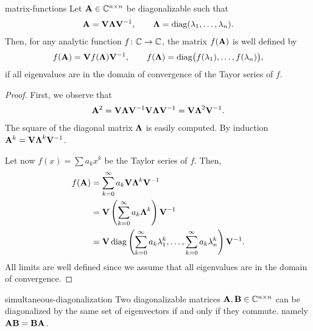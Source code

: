 \begin{Theorem}{matrix-functions}
  Let $\mathbf A\in \mathbb C^{n\times n}$ be diagonalizable such that
  \begin{gather}
    \mathbf A = \mathbf V \boldsymbol\Lambda \mathbf V^{-1},
    \qquad \boldsymbol\Lambda = \operatorname{diag}(\lambda_1,\dots,\lambda_n).
  \end{gather}
  Then, for any analytic function $f\colon \mathbb C \to \mathbb C$, the matrix
  $f(\mathbf A)$ is well defined by
  \begin{gather}
    f(\mathbf A) = \mathbf V f(\boldsymbol\Lambda) \mathbf V^{-1},
    \qquad f(\boldsymbol\Lambda) = \operatorname{diag}\bigl(f(\lambda_1),\dots,f(\lambda_n)\bigr),
  \end{gather}
  if all eigenvalues are in the domain of convergence of the Tayor
  series of $f$.
\end{Theorem}

\begin{proof}
  First, we observe that
  \begin{gather}
    \mathbf A^2 = \mathbf V \boldsymbol\Lambda \mathbf V^{-1} \mathbf V \boldsymbol\Lambda \mathbf V^{-1}
    = \mathbf V \boldsymbol\Lambda^2 \mathbf V^{-1}.
  \end{gather}
  The square of the diagonal matrix $\boldsymbol\Lambda$ is easily computed.
  By induction $\mathbf A^k =  \mathbf V \boldsymbol\Lambda^k \mathbf V^{-1}$.

  Let now $f(x) = \sum a_k x^k$ be the Taylor series of $f$. Then,
  \begin{gather}
    \begin{split}
      f(\mathbf A)
      &= \sum_{k=0}^\infty a_k  \mathbf V \boldsymbol\Lambda^k \mathbf V^{-1}\\
      &= \mathbf V \left(\sum_{k=0}^\infty a_k \boldsymbol\Lambda^k\right) \mathbf V^{-1}\\
      &= \mathbf V \operatorname{diag}\left(
        \sum_{k=0}^\infty a_k \lambda_1^k,\dots,
        \sum_{k=0}^\infty a_k\lambda_n^k
      \right)  \mathbf V^{-1}.
    \end{split}
  \end{gather}
  All limits are well defined since we assume that all eigenvalues are
  in the domain of convergence.
\end{proof}

\begin{Theorem}{simultaneous-diagonalization}
  Two diagonalizable matrices $\mathbf A, \mathbf B\in \mathbb C^{n\times n}$ can be
  diagonalized by the same set of eigenvectors if and only if they
  commute. namely $\mathbf A\mathbf B = \mathbf B\mathbf A$.
\end{Theorem}

